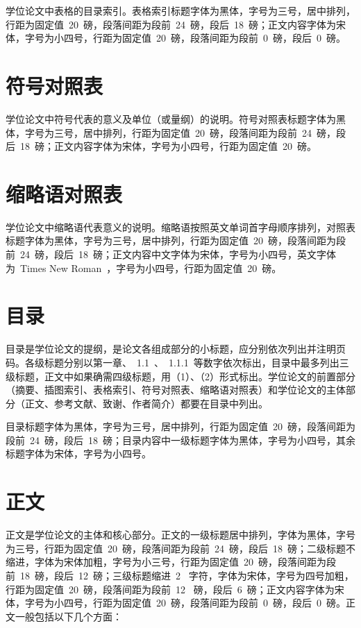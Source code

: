 学位论文中表格的目录索引。表格索引标题字体为黑体，字号为三号，居中排列，行距为固定值~20~磅，段落间距为段前~24~磅，段后~18~磅；正文内容字体为宋体，字号为小四号，行距为固定值~20~磅，段落间距为段前~0~磅，段后~0~磅。

\section{符号对照表}

学位论文中符号代表的意义及单位（或量纲）的说明。符号对照表标题字体为黑体，字号为三号，居中排列，行距为固定值~20~磅，段落间距为段前~24~磅，段后~18~磅；正文内容字体为宋体，字号为小四号，行距为固定值~20~磅。

\section{缩略语对照表}

学位论文中缩略语代表意义的说明。缩略语按照英文单词首字母顺序排列，对照表标题字体为黑体，字号为三号，居中排列，行距为固定值~20~磅，段落间距为段前~24~磅，段后~18~磅；正文内容中文字体为宋体，字号为小四号，英文字体为~Times New Roman~，字号为小四号，行距为固定值~20~磅。

\section{目录}

目录是学位论文的提纲，是论文各组成部分的小标题，应分别依次列出并注明页码。各级标题分别以第一章、~1.1~、~1.1.1~等数字依次标出，目录中最多列出三级标题，正文中如果确需四级标题，用（1）、（2）形式标出。学位论文的前置部分（摘要、插图索引、表格索引、符号对照表、缩略语对照表）和学位论文的主体部分（正文、参考文献、致谢、作者简介）都要在目录中列出。

目录标题字体为黑体，字号为三号，居中排列，行距为固定值~20~磅，段落间距为段前~24~磅，段后~18~磅；目录内容中一级标题字体为黑体，字号为小四号，其余标题字体为宋体，字号为小四号。

\section{正文}

正文是学位论文的主体和核心部分。正文的一级标题居中排列，字体为黑体，字号为三号，行距为固定值~20~磅，段落间距为段前~24~磅，段后~18~磅；二级标题不缩进，字体为宋体加粗，字号为小三号，行距为固定值~20~磅，段落间距为段前~18~磅，段后~12~磅；三级标题缩进~2~ 字符，字体为宋体，字号为四号加粗，行距为固定值~20~磅，段落间距为段前~12~ 磅，段后~6~磅；正文内容字体为宋体，字号为小四号，行距为固定值~20~磅，段落间距为段前~0~磅，段后~0~磅。正文一般包括以下几个方面：

